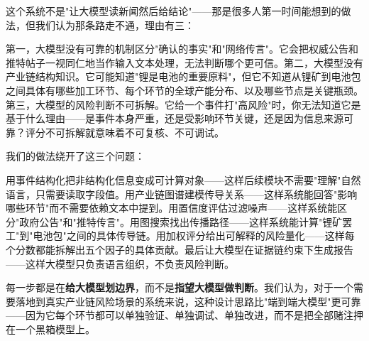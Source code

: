 \documentclass[12pt,a4paper]{ctexart}
\begin{document}
这个系统不是"让大模型读新闻然后给结论"——那是很多人第一时间能想到的做法，但我们认为那条路走不通，理由有三：

第一，大模型没有可靠的机制区分"确认的事实"和"网络传言"。它会把权威公告和推特帖子一视同仁地当作输入文本处理，无法判断哪个更可信。第二，大模型没有产业链结构知识。它可能知道"锂是电池的重要原料"，但它不知道从锂矿到电池包之间具体有哪些加工环节、每个环节的全球产能分布、以及哪些节点是关键瓶颈。第三，大模型的风险判断不可拆解。它给一个事件打"高风险"时，你无法知道它是基于什么理由——是事件本身严重，还是受影响环节关键，还是因为信息来源可靠？评分不可拆解就意味着不可复核、不可调试。

我们的做法绕开了这三个问题：

用事件结构化把非结构化信息变成可计算对象——这样后续模块不需要"理解"自然语言，只需要读取字段值。用产业链图谱建模传导关系——这样系统能回答"影响哪些环节"而不需要依赖文本中提到。用置信度评估过滤噪声——这样系统能区分"政府公告"和"推特传言"。用图搜索找出传播路径——这样系统能计算"锂矿罢工"到"电池包"之间的具体传导链。用加权评分给出可解释的风险量化——这样每个分数都能拆解出五个因子的具体贡献。最后让大模型在证据链约束下生成报告——这样大模型只负责语言组织，不负责风险判断。

每一步都是在\textbf{给大模型划边界}，而不是\textbf{指望大模型做判断}。我们认为，对于一个需要落地到真实产业链风险场景的系统来说，这种设计思路比"端到端大模型"更可靠——因为它每个环节都可以单独验证、单独调试、单独改进，而不是把全部赌注押在一个黑箱模型上。
\end{document}
